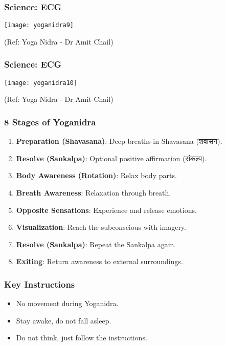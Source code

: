 \begin{frame}[fragile]\frametitle{Science: ECG}
      \begin{center}
        \texttt{[image: yoganidra9]}

		{\tiny (Ref: Yoga Nidra - Dr Amit Chail)}		
        \end{center}

\end{frame}

\begin{frame}[fragile]\frametitle{Science: ECG}
      \begin{center}
        \texttt{[image: yoganidra10]}

		{\tiny (Ref: Yoga Nidra - Dr Amit Chail)}		
        \end{center}

\end{frame}



\begin{frame}[fragile]\frametitle{8 Stages of Yoganidra}
    \begin{enumerate}
        \item \textbf{Preparation (Shavasana)}: Deep breaths in Shavasana (शवासन).
        \item \textbf{Resolve (Sankalpa)}: Optional positive affirmation (संकल्प).
        \item \textbf{Body Awareness (Rotation)}: Relax body parts.
        \item \textbf{Breath Awareness}: Relaxation through breath.
        \item \textbf{Opposite Sensations}: Experience and release emotions.
        \item \textbf{Visualization}: Reach the subconscious with imagery.
        \item \textbf{Resolve (Sankalpa)}: Repeat the Sankalpa again.
        \item \textbf{Exiting}: Return awareness to external surroundings.
    \end{enumerate}
\end{frame}

\begin{frame}[fragile]\frametitle{Key Instructions}
    \begin{itemize}
        \item No movement during Yoganidra.
        \item Stay awake, do not fall asleep.
        \item Do not think, just follow the instructions.
    \end{itemize}
\end{frame}


